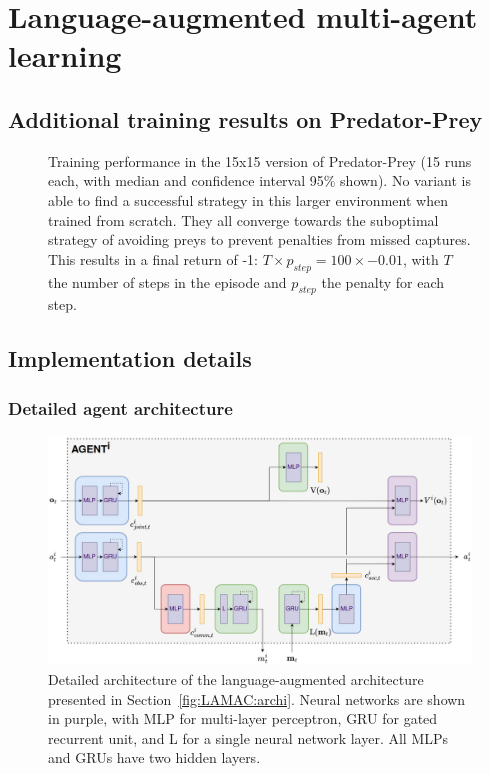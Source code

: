 \chapter{Language-augmented multi-agent learning} 

\section{Additional training results on Predator-Prey}\label{app:LAMAC:results}

\begin{figure}[h]
    \centering
    
    \caption{Training performance in the 15x15 version of Predator-Prey (15 runs each, with median and confidence interval 95\% shown). No variant is able to find a successful strategy in this larger environment when trained from scratch. They all converge towards the suboptimal strategy of avoiding preys to prevent penalties from missed captures. This results in a final return of -1: $T\times p_{step} = 100 \times -0.01$, with $T$ the number of steps in the episode and $p_{step}$ the penalty for each step.}
    \label{fig:trainSA15}
\end{figure}


\clearpage

\section{Implementation details}\label{app:LAMAC:archi}

\subsection{Detailed agent architecture}

\begin{figure}[h]
    \centering
    \includegraphics[width=\linewidth]{Figures/LAMAC/archi_detail.png}
    \caption{Detailed architecture of the language-augmented architecture presented in Section~\ref{fig:LAMAC:archi}. Neural networks are shown in purple, with MLP for multi-layer perceptron, GRU for gated recurrent unit, and L for a single neural network layer. All MLPs and GRUs have two hidden layers. }
    \label{fig:App_LAMAC_archi}
\end{figure}

